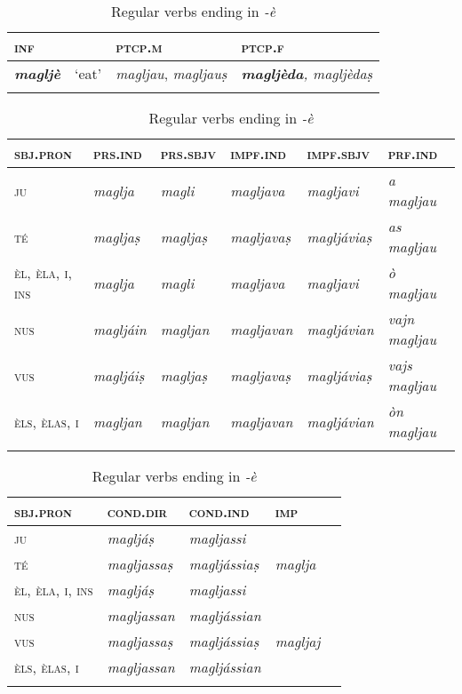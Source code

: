 \begin{table}
\caption{Regular verbs ending in \textit{-è}}
\label{conjè}
 \begin{tabularx}{.8\textwidth}{llll}
 
  \lsptoprule
  \textsc{inf}  && \textsc{ptcp.m}  & \textsc{ptcp.f}\\
  \midrule
  \textit{\textbf{magljè}} & `eat' & \textit{magljau}, \textit{magljauṣ} & \textit{\textbf{magljèda}, \textit{magljèdaṣ}}\\
  \lspbottomrule  
  \end{tabularx}
  
  \medskip
  
 \begin{tabularx}{\textwidth}{p{2cm}lllll}
  \lsptoprule
\textsc{sbj.pron} &\textsc{prs.ind} &\textsc{prs.sbjv} &\textsc{impf.ind} & \textsc{impf.sbjv} &\textsc{prf.ind}\\
 \midrule
\textsc{ju} &\textit{maglja} & \textit{magli}&\textit{magljava} &\textit{magljavi} & \textit{a magljau}\\
\textsc{té} &\textit{magljaṣ} & \textit{magljaṣ}&\textit{magljavaṣ} &\textit{magljáviaṣ} &\textit{as magljau}\\
\textsc{èl, èla, i, ins}  &\textit{maglja} &\textit{magli} & \textit{magljava} &\textit{magljavi} &\textit{ò magljau}\\
\textsc{nus} &\textit{magljáin} & \textit{magljan} &\textit{magljavan} &\textit{magljávian} &\textit{vajn magljau}\\
\textsc{vus} &\textit{magljáiṣ} &\textit{magljaṣ} & \textit{magljavaṣ} &\textit{magljáviaṣ} &\textit{vajs magljau}\\
\textsc{èls, èlas, i} & \textit{magljan} &\textit{magljan} &\textit{magljavan} &\textit{magljávian} &\textit{òn magljau}\\
  \lspbottomrule
\end{tabularx}

\medskip

\begin{tabularx} {\textwidth}{p{2cm}llll}
 \lsptoprule
  \textsc{sbj.pron} &\textsc{cond.dir} &  \textsc{cond.ind}  &\textsc{imp}\\
\midrule
\textsc{ju} & \textit{magljáṣ}&\textit{magljassi} &\\
\textsc{té}  & \textit{magljassaṣ}&\textit{magljássiaṣ} &\textit{maglja}\\
\textsc{èl, èla, i, ins} & \textit{magljáṣ} &\textit{magljassi} &\\
\textsc{nus} & \textit{magljassan} & \textit{magljássian} &\\
\textsc{vus} & \textit{magljassaṣ} & \textit{magljássiaṣ} &\textit{magljaj}\\
\textsc{èls, èlas, i} & \textit{magljassan} & \textit{magljássian}&\\
  \lspbottomrule
 \end{tabularx} 
\end{table}

